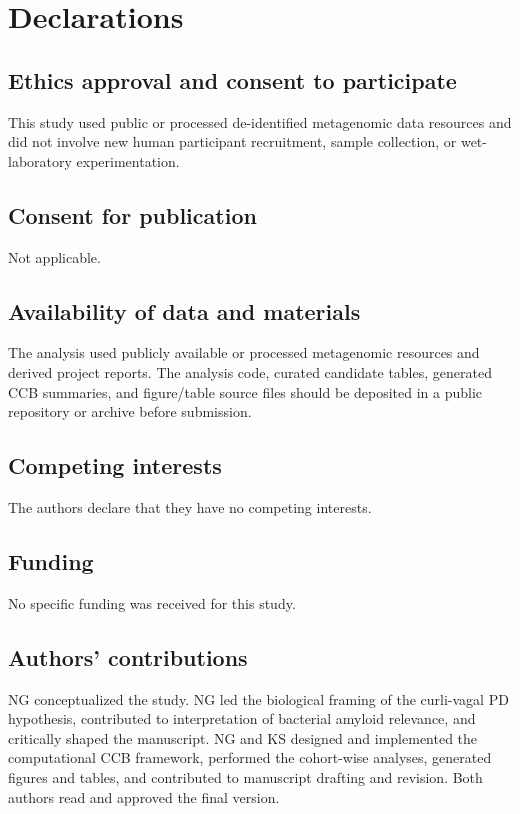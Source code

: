 \documentclass[11pt]{article}
\begin{document}
\section*{Declarations}

\subsection*{Ethics approval and consent to participate}
This study used public or processed de-identified metagenomic data resources and did not involve new human participant recruitment, sample collection, or wet-laboratory experimentation.

\subsection*{Consent for publication}
Not applicable.

\subsection*{Availability of data and materials}
The analysis used publicly available or processed metagenomic resources and derived project reports. The analysis code, curated candidate tables, generated CCB summaries, and figure/table source files should be deposited in a public repository or archive before submission.

\subsection*{Competing interests}
The authors declare that they have no competing interests.

\subsection*{Funding}
No specific funding was received for this study.

\subsection*{Authors' contributions}
NG conceptualized the study. NG led the biological framing of the curli-vagal PD hypothesis, contributed to interpretation of bacterial amyloid relevance, and critically shaped the manuscript. NG and KS designed and implemented the computational CCB framework, performed the cohort-wise analyses, generated figures and tables, and contributed to manuscript drafting and revision. Both authors read and approved the final version.
\end{document}
